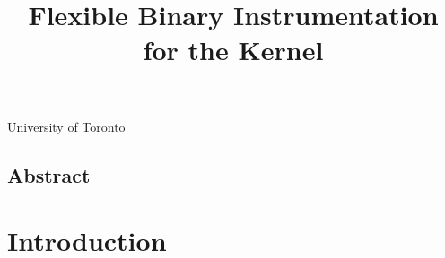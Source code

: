 \documentclass[preprint]{sigplanconf}
\begin{document}
\title{Flexible Binary Instrumentation for the Kernel}

{University of Toronto}{}

\maketitle
\subsection*{Abstract}



\section{Introduction}\label{sec:intro}
\end{document}
